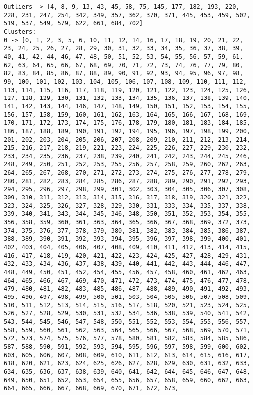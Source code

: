 \documentclass[11pt]{article}
\begin{document}
    \begin{Verbatim}[commandchars=\\\{\}]
Outliers -> [4, 8, 9, 13, 43, 45, 58, 75, 145, 177, 182, 193, 220, 228, 231, 247, 254, 342, 349, 357, 362, 370, 371, 445, 453, 459, 502, 519, 537, 549, 579, 622, 661, 684, 702]
Clusters:
0 -> [0, 1, 2, 3, 5, 6, 10, 11, 12, 14, 16, 17, 18, 19, 20, 21, 22, 23, 24, 25, 26, 27, 28, 29, 30, 31, 32, 33, 34, 35, 36, 37, 38, 39, 40, 41, 42, 44, 46, 47, 48, 50, 51, 52, 53, 54, 55, 56, 57, 59, 61, 62, 63, 64, 65, 66, 67, 68, 69, 70, 71, 72, 73, 74, 76, 77, 79, 80, 82, 83, 84, 85, 86, 87, 88, 89, 90, 91, 92, 93, 94, 95, 96, 97, 98, 99, 100, 101, 102, 103, 104, 105, 106, 107, 108, 109, 110, 111, 112, 113, 114, 115, 116, 117, 118, 119, 120, 121, 122, 123, 124, 125, 126, 127, 128, 129, 130, 131, 132, 133, 134, 135, 136, 137, 138, 139, 140, 141, 142, 143, 144, 146, 147, 148, 149, 150, 151, 152, 153, 154, 155, 156, 157, 158, 159, 160, 161, 162, 163, 164, 165, 166, 167, 168, 169, 170, 171, 172, 173, 174, 175, 176, 178, 179, 180, 181, 183, 184, 185, 186, 187, 188, 189, 190, 191, 192, 194, 195, 196, 197, 198, 199, 200, 201, 202, 203, 204, 205, 206, 207, 208, 209, 210, 211, 212, 213, 214, 215, 216, 217, 218, 219, 221, 223, 224, 225, 226, 227, 229, 230, 232, 233, 234, 235, 236, 237, 238, 239, 240, 241, 242, 243, 244, 245, 246, 248, 249, 250, 251, 252, 253, 255, 256, 257, 258, 259, 260, 262, 263, 264, 265, 267, 268, 270, 271, 272, 273, 274, 275, 276, 277, 278, 279, 280, 281, 282, 283, 284, 285, 286, 287, 288, 289, 290, 291, 292, 293, 294, 295, 296, 297, 298, 299, 301, 302, 303, 304, 305, 306, 307, 308, 309, 310, 311, 312, 313, 314, 315, 316, 317, 318, 319, 320, 321, 322, 323, 324, 325, 326, 327, 328, 329, 330, 331, 333, 334, 335, 337, 338, 339, 340, 341, 343, 344, 345, 346, 348, 350, 351, 352, 353, 354, 355, 356, 358, 359, 360, 361, 363, 364, 365, 366, 367, 368, 369, 372, 373, 374, 375, 376, 377, 378, 379, 380, 381, 382, 383, 384, 385, 386, 387, 388, 389, 390, 391, 392, 393, 394, 395, 396, 397, 398, 399, 400, 401, 402, 403, 404, 405, 406, 407, 408, 409, 410, 411, 412, 413, 414, 415, 416, 417, 418, 419, 420, 421, 422, 423, 424, 425, 427, 428, 429, 431, 432, 433, 434, 436, 437, 438, 439, 440, 441, 442, 443, 444, 446, 447, 448, 449, 450, 451, 452, 454, 455, 456, 457, 458, 460, 461, 462, 463, 464, 465, 466, 467, 469, 470, 471, 472, 473, 474, 475, 476, 477, 478, 479, 480, 481, 482, 483, 485, 486, 487, 488, 489, 490, 491, 492, 493, 495, 496, 497, 498, 499, 500, 501, 503, 504, 505, 506, 507, 508, 509, 510, 511, 512, 513, 514, 515, 516, 517, 518, 520, 521, 523, 524, 525, 526, 527, 528, 529, 530, 531, 532, 534, 536, 538, 539, 540, 541, 542, 543, 544, 545, 546, 547, 548, 550, 551, 552, 553, 554, 555, 556, 557, 558, 559, 560, 561, 562, 563, 564, 565, 566, 567, 568, 569, 570, 571, 572, 573, 574, 575, 576, 577, 578, 580, 581, 582, 583, 584, 585, 586, 587, 588, 590, 591, 592, 593, 594, 595, 596, 597, 598, 599, 600, 602, 603, 605, 606, 607, 608, 609, 610, 611, 612, 613, 614, 615, 616, 617, 618, 620, 621, 623, 624, 625, 626, 627, 628, 629, 630, 631, 632, 633, 634, 635, 636, 637, 638, 639, 640, 641, 642, 644, 645, 646, 647, 648, 649, 650, 651, 652, 653, 654, 655, 656, 657, 658, 659, 660, 662, 663, 664, 665, 666, 667, 668, 669, 670, 671, 672, 673, 
\end{Verbatim}
\end{document}

